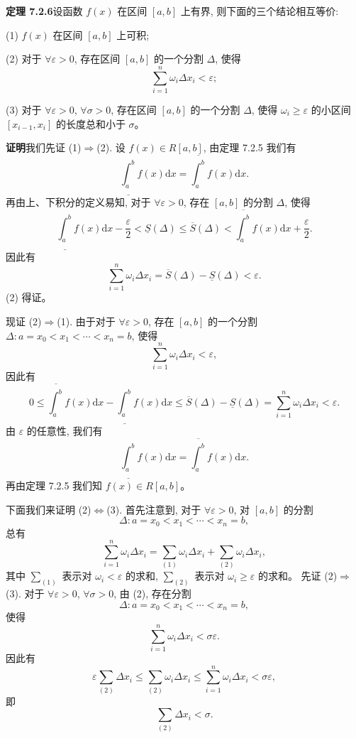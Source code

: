\documentclass[UTF8, 12pt, fontset=fandol, oneside]{ctexart}
\begin{document}
\noindent\textbf{定理 7.2.6}\quad 设函数 $f(x)$ 在区间 $[a,b]$ 上有界, 则下面的三个结论相互等价:

(1) $f(x)$ 在区间 $[a,b]$ 上可积;

(2) 对于 $\forall\varepsilon>0$, 存在区间 $[a,b]$ 的一个分割 $\Delta$, 使得
\[
  \sum_{i=1}^n \omega_i\Delta x_i<\varepsilon;
\]

(3) 对于 $\forall\varepsilon>0$, $\forall\sigma>0$, 存在区间 $[a,b]$ 的一个分割 $\Delta$, 使得 $\omega_i\geq\varepsilon$ 的小区间 $[x_{i-1},x_i]$ 的长度总和小于 $\sigma$。

\noindent\textbf{证明}\quad 我们先证 (1)$\Rightarrow$(2). 设 $f(x)\in R[a,b]$, 由定理 7.2.5 我们有
\[
  \underline{\int_a^b} f(x)\mathrm dx=\overline{\int_a^b} f(x)\mathrm dx.
\]
再由上、下积分的定义易知, 对于 $\forall\varepsilon>0$, 存在 $[a,b]$ 的分割 $\Delta$, 使得
\[
  \underline{\int_a^b} f(x)\mathrm dx-\frac{\varepsilon}{2}<\underline S(\Delta)\leq \overline S(\Delta)<\overline{\int_a^b} f(x)\mathrm dx+\frac{\varepsilon}{2}.
\]
因此有
\[
  \sum_{i=1}^n \omega_i\Delta x_i=\overline S(\Delta)-\underline S(\Delta)<\varepsilon.
\]
(2) 得证。

现证 (2)$\Rightarrow$(1). 由于对于 $\forall\varepsilon>0$, 存在 $[a,b]$ 的一个分割 $\Delta:a=x_0<x_1<\cdots<x_n=b$, 使得
\[
  \sum_{i=1}^n \omega_i\Delta x_i<\varepsilon,
\]
因此有
\[
  0\leq \overline{\int_a^b} f(x)\mathrm dx-\underline{\int_a^b} f(x)\mathrm dx
  \leq \overline S(\Delta)-\underline S(\Delta)
  =\sum_{i=1}^n\omega_i\Delta x_i<\varepsilon.
\]
由 $\varepsilon$ 的任意性, 我们有
\[
  \underline{\int_a^b} f(x)\mathrm dx=\overline{\int_a^b} f(x)\mathrm dx.
\]
再由定理 7.2.5 我们知 $f(x)\in R[a,b]$。

下面我们来证明 (2)$\Longleftrightarrow$(3). 首先注意到, 对于 $\forall\varepsilon>0$, 对 $[a,b]$ 的分割
\[
  \Delta:a=x_0<x_1<\cdots<x_n=b,
\]
总有
\[
  \sum_{i=1}^n\omega_i\Delta x_i=\sum_{(1)}\omega_i\Delta x_i+\sum_{(2)}\omega_i\Delta x_i,
\]
其中 $\sum_{(1)}$ 表示对 $\omega_i<\varepsilon$ 的求和, $\sum_{(2)}$ 表示对 $\omega_i\geq\varepsilon$ 的求和。
先证 (2)$\Rightarrow$(3). 对于 $\forall\varepsilon>0$, $\forall\sigma>0$, 由 (2), 存在分割
\[
  \Delta:a=x_0<x_1<\cdots<x_n=b,
\]
使得
\[
  \sum_{i=1}^n\omega_i\Delta x_i<\sigma\varepsilon.
\]
因此有
\[
  \varepsilon\sum_{(2)}\Delta x_i\leq \sum_{(2)}\omega_i\Delta x_i\leq \sum_{i=1}^n\omega_i\Delta x_i<\sigma\varepsilon,
\]
即
\[
  \sum_{(2)}\Delta x_i<\sigma.
\]
\end{document}
